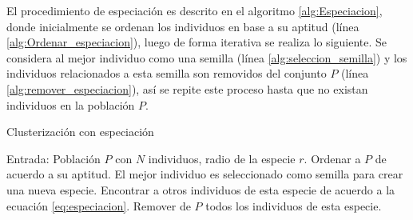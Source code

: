 %
El procedimiento de especiación es descrito en el algoritmo \ref{alg:Especiacion}, donde inicialmente se ordenan los individuos en base a su aptitud (línea \ref{alg:Ordenar_especiacion}), luego de forma iterativa se realiza lo siguiente.
%
Se considera al mejor individuo como una semilla (línea \ref{alg:seleccion_semilla}) y los individuos relacionados a esta semilla son removidos del conjunto $P$ (línea \ref{alg:remover_especiacion}), así se repite este proceso hasta que no existan individuos en la población $P$.
%
\begin{algorithm}[H]
\scriptsize
\caption{Clusterización con especiación}
\label{alg:Especiacion}
\begin{scriptsize}
\begin{algorithmic}[1]
\STATE Entrada: Población $P$ con $N$ individuos,  radio de la especie $r$.
\STATE Ordenar a $P$ de acuerdo a su aptitud. \label{alg:Ordenar_especiacion}
   \STATE El mejor individuo es seleccionado como semilla para crear una nueva especie. \label{alg:seleccion_semilla}
   \STATE Encontrar a otros individuos de esta especie de acuerdo a la ecuación \ref{eq:especiacion}.
   \STATE Remover de $P$ todos los individuos de esta especie.\label{alg:remover_especiacion}
\ENDWHILE
\end{algorithmic}
\end{scriptsize}
\end{algorithm}

